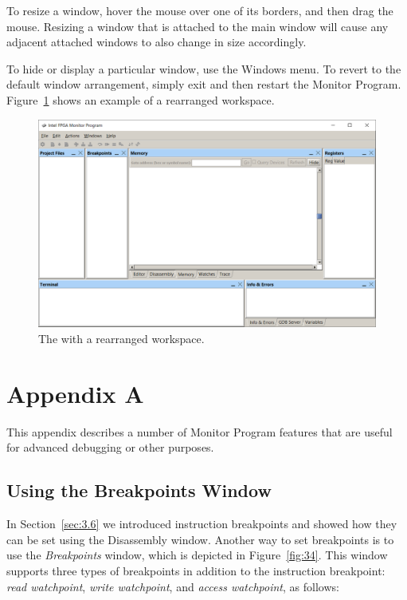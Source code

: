 \documentclass[11pt, twoside, pdftex]{article}
\begin{document}
To resize a window, hover the mouse over one of its borders, and
then drag the mouse. Resizing a window that is attached to the
main window will cause any adjacent attached windows to also
change in size accordingly.

To hide or display a particular window, use the {\sf Windows}
menu. To revert to the default window arrangement, simply exit
and then restart the Monitor Program. Figure~\ref{fig:33} shows an example
of a rearranged workspace.

\begin{figure}[H]
   \begin{center}
      \includegraphics[scale=0.6]{screenshots/figure33.png}
   \end{center}
   \caption{The \productNameMed{} with a rearranged workspace.} 
	 \label{fig:33}
\end{figure}

\newpage
\section{Appendix A}
\label{sec:9}

This appendix describes a number of Monitor Program features that
are useful for advanced debugging or other purposes.

\subsection{Using the Breakpoints Window}
\label{sec:9.1}

In Section~\ref{sec:3.6} we introduced instruction breakpoints and showed
how they can be set using the Disassembly window. Another way to
set breakpoints is to use the {\it Breakpoints} window, which is
depicted in Figure~\ref{fig:34}. This window supports three 
types of breakpoints in addition to the instruction breakpoint:
{\it read watchpoint}, {\it write watchpoint}, and 
{\it access watchpoint}, as follows:
\end{document}
